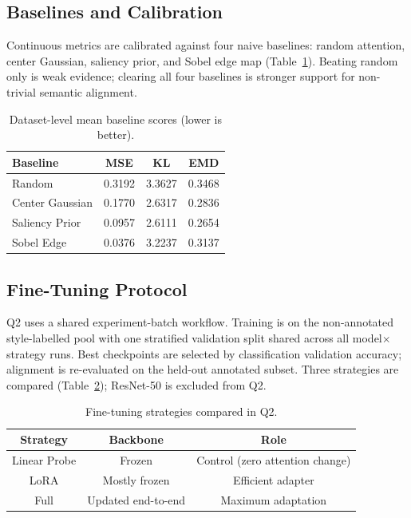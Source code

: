 \documentclass[lineno,pdflatex,sn-mathphys-num]{sn-jnl}%
\theoremstyle{thmstyleone}%
\theoremstyle{thmstyletwo}%
\theoremstyle{thmstylethree}%
\begin{document}
\subsection{Baselines and Calibration}

Continuous metrics are calibrated against four naive baselines: random
attention, center Gaussian, saliency prior, and Sobel edge map
(Table~\ref{tab:baselines}). Beating random only is weak evidence; clearing
all four baselines is stronger support for non-trivial semantic alignment.

\begin{table}[h]
\centering
\caption{Dataset-level mean baseline scores (lower is better).}
\label{tab:baselines}
\begin{tabular}{lccc}
\toprule
Baseline & MSE & KL & EMD \\
\midrule
Random         & 0.3192 & 3.3627 & 0.3468 \\
Center Gaussian & 0.1770 & 2.6317 & 0.2836 \\
Saliency Prior & 0.0957 & 2.6111 & 0.2654 \\
Sobel Edge     & 0.0376 & 3.2237 & 0.3137 \\
\bottomrule
\end{tabular}%
\end{table}

\subsection{Fine-Tuning Protocol}

Q2 uses a shared experiment-batch workflow. Training is on the non-annotated
style-labelled pool with one stratified validation split shared across all
model$\times$strategy runs. Best checkpoints are selected by classification
validation accuracy; alignment is re-evaluated on the held-out annotated subset.
Three strategies are compared (Table~\ref{tab:strategies}); ResNet-50 is
excluded from Q2.

\begin{table}[h]
\centering
\caption{Fine-tuning strategies compared in Q2.}
\label{tab:strategies}
{\begin{tabular}{ccc}
\toprule
Strategy & Backbone & Role \\
\midrule
Linear Probe & Frozen & Control (zero attention change) \\
LoRA         & Mostly frozen & Efficient adapter \\
Full         & Updated end-to-end & Maximum adaptation \\
\bottomrule
\end{tabular}%
}
\end{table}
\end{document}
